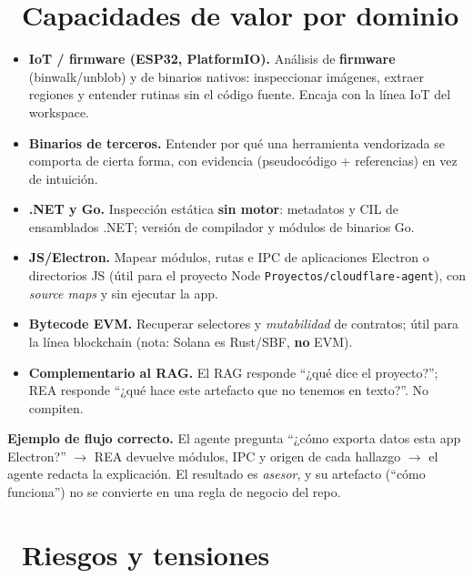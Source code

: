 \documentclass[11pt,a4paper]{article}
\newcommand{\iconotexto}[2]{\textcolor{cyanNeon}{\faIcon{#1}}~#2}
\begin{document}
\section[Valor para ELECTRONICA]{\iconotexto{chart-line}{Capacidades de valor por dominio}}

\begin{itemize}[leftmargin=1.4em]
  \item \textbf{IoT / firmware (ESP32, PlatformIO).} Análisis de \textbf{firmware}
  (binwalk/unblob) y de binarios nativos: inspeccionar imágenes, extraer regiones y
  entender rutinas sin el código fuente. Encaja con la línea IoT del workspace.
  \item \textbf{Binarios de terceros.} Entender por qué una herramienta vendorizada se
  comporta de cierta forma, con evidencia (pseudocódigo + referencias) en vez de intuición.
  \item \textbf{.NET y Go.} Inspección estática \textbf{sin motor}: metadatos y CIL de
  ensamblados .NET; versión de compilador y módulos de binarios Go.
  \item \textbf{JS/Electron.} Mapear módulos, rutas e IPC de aplicaciones Electron o
  directorios JS (útil para el proyecto Node \texttt{Proyectos/cloudflare-agent}), con
  \emph{source maps} y sin ejecutar la app.
  \item \textbf{Bytecode EVM.} Recuperar selectores y \emph{mutabilidad} de contratos;
  útil para la línea blockchain (nota: Solana es Rust/SBF, \textbf{no} EVM).
  \item \textbf{Complementario al RAG.} El RAG responde ``¿qué dice el proyecto?'';
  REA responde ``¿qué hace este artefacto que no tenemos en texto?''. No compiten.
\end{itemize}

\begin{cajaEjemplo}
\textbf{Ejemplo de flujo correcto.} El agente pregunta ``¿cómo exporta datos esta app
Electron?'' $\rightarrow$ REA devuelve módulos, IPC y origen de cada hallazgo
$\rightarrow$ el agente redacta la explicación. El resultado es \emph{asesor}, y su
artefacto (``cómo funciona'') no se convierte en una regla de negocio del repo.
\end{cajaEjemplo}

\section[Riesgos y Tensiones]{\iconotexto{shield-alt}{Riesgos y tensiones}}
\end{document}
